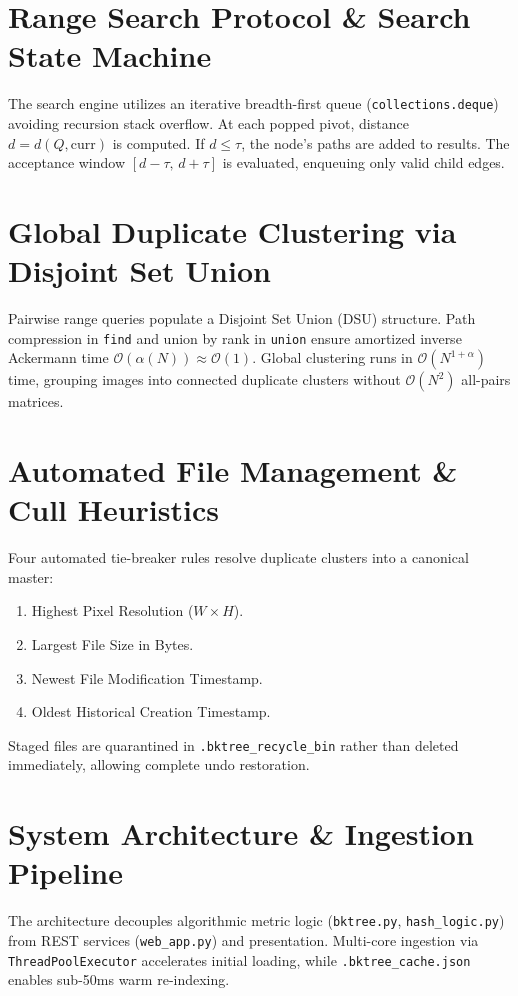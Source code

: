 \documentclass[11pt,a4paper]{article}
\begin{document}
\section{Range Search Protocol \& Search State Machine}
The search engine utilizes an iterative breadth-first queue (\texttt{collections.deque}) avoiding recursion stack overflow. At each popped pivot, distance $d = d(Q, \text{curr})$ is computed. If $d \le \tau$, the node's paths are added to results. The acceptance window $[d - \tau, \, d + \tau]$ is evaluated, enqueuing only valid child edges.

\section{Global Duplicate Clustering via Disjoint Set Union}
Pairwise range queries populate a Disjoint Set Union (DSU) structure. Path compression in \texttt{find} and union by rank in \texttt{union} ensure amortized inverse Ackermann time $\mathcal{O}(\alpha(N)) \approx \mathcal{O}(1)$. Global clustering runs in $\mathcal{O}(N^{1+\alpha})$ time, grouping images into connected duplicate clusters without $\mathcal{O}(N^2)$ all-pairs matrices.

\section{Automated File Management \& Cull Heuristics}
Four automated tie-breaker rules resolve duplicate clusters into a canonical master:
\begin{enumerate}
    \item Highest Pixel Resolution ($W \times H$).
    \item Largest File Size in Bytes.
    \item Newest File Modification Timestamp.
    \item Oldest Historical Creation Timestamp.
\end{enumerate}
Staged files are quarantined in \texttt{.bktree\_recycle\_bin} rather than deleted immediately, allowing complete undo restoration.

\section{System Architecture \& Ingestion Pipeline}
The architecture decouples algorithmic metric logic (\texttt{bktree.py}, \texttt{hash\_logic.py}) from REST services (\texttt{web\_app.py}) and presentation. Multi-core ingestion via \texttt{ThreadPoolExecutor} accelerates initial loading, while \texttt{.bktree\_cache.json} enables sub-50ms warm re-indexing.
\end{document}

